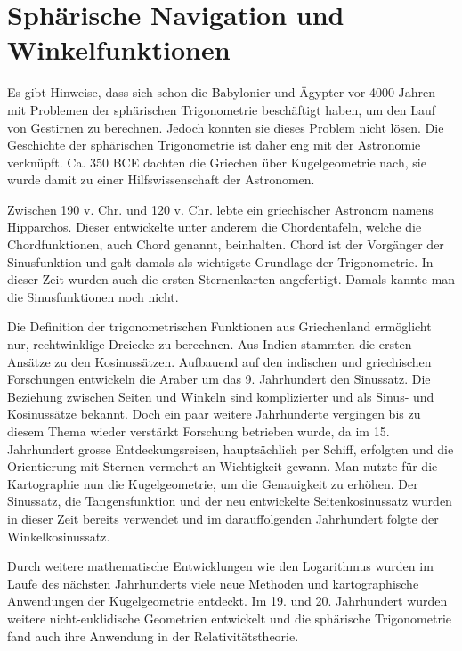 


\section{Sphärische Navigation und Winkelfunktionen}
Es gibt Hinweise, dass sich schon die Babylonier und Ägypter vor 4000 Jahren mit Problemen der sphärischen Trigonometrie beschäftigt haben, um den Lauf von Gestirnen zu berechnen. 
Jedoch konnten sie dieses Problem nicht lösen. 
Die Geschichte der sphärischen Trigonometrie ist daher eng mit der Astronomie verknüpft. Ca. 350 BCE dachten die Griechen über Kugelgeometrie nach, sie wurde damit zu einer Hilfswissenschaft der Astronomen. 

Zwischen 190 v. Chr. und 120 v. Chr. lebte ein griechischer Astronom namens Hipparchos. 
Dieser entwickelte unter anderem die Chordentafeln, welche die Chordfunktionen, auch Chord genannt, beinhalten.
Chord ist der Vorgänger der Sinusfunktion und galt damals als wichtigste Grundlage der Trigonometrie.
In dieser Zeit wurden auch die ersten Sternenkarten angefertigt. Damals kannte man die Sinusfunktionen noch nicht. 

Die Definition der trigonometrischen Funktionen aus Griechenland ermöglicht nur, rechtwinklige Dreiecke zu berechnen.
Aus Indien stammten die ersten Ansätze zu den Kosinussätzen.
Aufbauend auf den indischen und griechischen Forschungen entwickeln die Araber um das 9. Jahrhundert den Sinussatz.  
Die Beziehung zwischen Seiten und Winkeln sind komplizierter und als Sinus- und Kosinussätze bekannt.
Doch ein paar weitere Jahrhunderte vergingen bis zu diesem Thema wieder verstärkt Forschung betrieben wurde, da im 15. Jahrhundert grosse Entdeckungsreisen, hauptsächlich per Schiff, erfolgten und die Orientierung mit Sternen vermehrt an Wichtigkeit gewann.
Man nutzte für die Kartographie nun die Kugelgeometrie, um die Genauigkeit zu erhöhen.
Der Sinussatz, die Tangensfunktion und der neu entwickelte Seitenkosinussatz wurden in dieser Zeit bereits verwendet und im darauffolgenden Jahrhundert folgte der Winkelkosinussatz. 

Durch weitere mathematische Entwicklungen wie den Logarithmus wurden im Laufe des nächsten Jahrhunderts viele neue Methoden und kartographische Anwendungen der Kugelgeometrie entdeckt. 
Im 19. und 20. Jahrhundert wurden weitere nicht-euklidische Geometrien entwickelt und die sphärische Trigonometrie fand auch ihre Anwendung in der Relativitätstheorie.